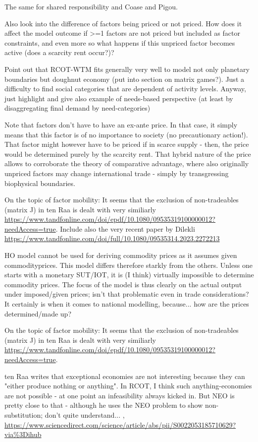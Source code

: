 The same for shared responsibility and Coase and Pigou.

Also look into the difference of factors being priced or not priced. How does it affect the model outcome if >=1 factors are not priced but included as factor constraints, and even more so what happens if this unpriced factor becomes active (does a scarcity rent occur?)?

Point out that RCOT-WTM fits generally very well to model not only planetary boundaries but doughnut economy (put into section on matrix games?). Just a difficulty to find social categories that are dependent of activity levels. Anyway, just highlight and give also example of needs-based perspective (at least by disaggregating final demand by need-categories)

Note that factors don't have to have an ex-ante price. In that case, it simply means that this factor is of no importance to society (no precautionary action!). That factor might however have to be priced if in scarce supply - then, the price would be determined purely by the scarcity rent. That hybrid nature of the price allows to corroborate the theory of comparative advantage, where also originally unpriced factors may change international trade - simply by transgressing biophysical boundaries.

On the topic of factor mobility: It seems that the exclusion of non-tradeables (matrix J) in ten Raa is dealt with very similiarly \url{https://www.tandfonline.com/doi/epdf/10.1080/09535319100000012?needAccess=true}. Include also the very recent paper by Dilekli \url{https://www.tandfonline.com/doi/full/10.1080/09535314.2023.2272213}

HO model cannot be used for deriving commodity prices as it assumes given commodityprices. This model differs therefore starkly from the others. Unless one starts with a monetary SUT/IOT, it is (I think) virtually impossible to determine commodity prices. The focus of the model is thus clearly on the actual output under imposed/given prices; isn't that problematic even in trade considerations? It certainly is when it comes to national modelling, because... how are the prices determined/made up?

On the topic of factor mobility: It seems that the exclusion of non-tradeables (matrix J) in ten Raa is dealt with very similiarly \url{https://www.tandfonline.com/doi/epdf/10.1080/09535319100000012?needAccess=true}.


ten Raa writes that exceptional economies are not interesting because they can "either produce nothing or anything". In RCOT, I think such anything-economies are not possible - at one point an infeasibility always kicked in. But NEO is pretty close to that - although he uses the NEO problem to show non-substitution; don't quite understand... , \url{https://www.sciencedirect.com/science/article/abs/pii/S0022053185710629?via%3Dihub}

